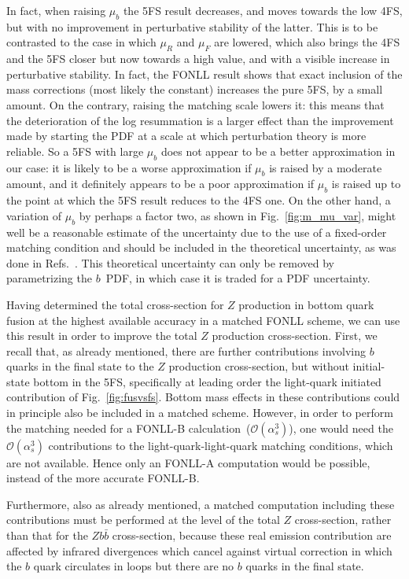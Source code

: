 \documentclass[12pt]{article}
\begin{document}
In fact, when raising $\mu_b$
the 5FS result decreases, and moves towards the low 4FS, but with no
improvement in perturbative stability of the latter. This is to be
contrasted to the case in which $\mu_R$ and $\mu_F$ are lowered, which
also brings the 4FS and the 5FS closer but now towards a high value,
and with a visible increase in perturbative stability. In fact, the
FONLL result shows that exact inclusion of the mass corrections (most
likely the constant) increases the pure 5FS, by a small
amount. On the contrary, raising the matching scale lowers it: this
means that the deterioration of the log resummation is a larger effect
than the improvement made by starting the PDF at a scale at which
perturbation theory is more reliable.
So a 5FS with
large $\mu_b$ does not appear to be a better approximation in our case:
it is likely to be a worse approximation if  $\mu_b$ is raised by a
moderate amount,
and it definitely appears to be a poor approximation if $\mu_b$ is
raised up to the point at which the 5FS result reduces to the 4FS
one. On the other hand, a variation of $\mu_b$ by perhaps a factor
two, as shown in Fig.~\ref{fig:m_mu_var}, might well be a reasonable
estimate of the uncertainty due to the use of a fixed-order matching
condition and should be included in the theoretical uncertainty, as was
done in Refs.~\cite{Bonvini:2016fgf,deFlorian:2016spz}. This theoretical
uncertainty can only be removed by parametrizing the $b$~PDF, in which
case it is  traded for a PDF uncertainty.


Having 
 determined the total cross-section for $Z$
production in bottom quark fusion at the highest available accuracy in
a matched FONLL scheme, we can use this result in
order to improve the total $Z$ production cross-section. First, we
recall that, as already mentioned, there are further contributions
involving $b$ quarks in the final state to the $Z$ production
cross-section, but without initial-state bottom in the 5FS,
specifically at leading order the light-quark initiated contribution of
Fig.~\ref{fig:fusvsfs}. Bottom mass effects in these contributions
could in principle also be included in a
matched scheme.
However, in order to perform the matching needed for a FONLL-B
calculation~($\mathcal{O}(\alpha_s^3)$), one would need the
$\mathcal{O}(\alpha_s^3)$ contributions to the light-quark-light-quark
matching conditions, which are not available. 
Hence only an FONLL-A computation would be possible,
instead of the more accurate FONLL-B.


Furthermore, also as already
mentioned, a matched computation including these contributions must be
performed at the level of the total $Z$ cross-section, rather than
that for  the $Zb\bar b$ cross-section, because these real emission
contribution 
are affected by infrared divergences which cancel against virtual
correction in which the $b$ quark circulates in loops but there are no
$b$ quarks in the final state. 
\end{document}
